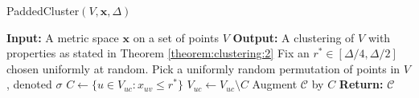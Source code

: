 \begin{algorithm}
\caption{{\sf PaddedCluster}$(V,\mathbf{x},\Delta)$}
\label{alg:cluster}
\begin{algorithmic}[1]
\Statex \textbf{Input:} A metric space $\mathbf{x}$ on a set of points $V$ 
\Statex \textbf{Output:} A clustering of $V$ with properties as stated in Theorem \ref{theorem:clustering:2}
\State Fix an $r^* \in [\Delta/4, \Delta/2]$ chosen uniformly at random.
\State Pick a uniformly random permutation of points in $V$, denoted $\sigma$
\State $C \gets \{ u \in V_{uc} : x_{uv} \le r^* \}$
\State $V_{uc} \gets V_{uc} \setminus C$ 
\State Augment $\mathcal{C}$ by $C$
\EndWhile
\Statex \textbf{Return:} $\mathcal{C}$
\end{algorithmic}
\end{algorithm}





